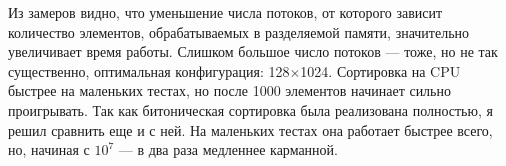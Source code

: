 Из замеров видно, что уменьшение числа потоков, от которого зависит количество элементов, обрабатываемых в разделяемой памяти, значительно увеличивает время работы. Слишком большое число потоков --- тоже, но не так существенно, оптимальная конфигурация: 128$\times$1024. Сортировка на CPU быстрее на маленьких тестах, но после 1000 элементов начинает сильно проигрывать. Так как битоническая сортировка была реализована полностью, я решил сравнить еще и с ней. На маленьких тестах она работает быстрее всего, но, начиная с $10^7$ --- в два раза медленнее карманной.
\pagebreak